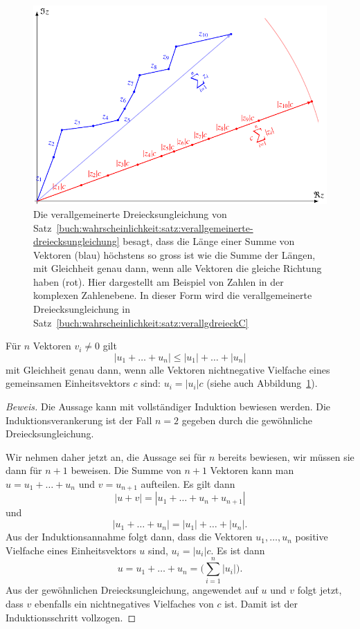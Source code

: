 \begin{figure}
\centering
\includegraphics{chapters/80-wahrscheinlichkeit/images/dreieck.pdf}
\caption{Die verallgemeinerte Dreiecksungleichung von
Satz~\ref{buch:wahrscheinlichkeit:satz:verallgemeinerte-dreiecksungleichung}
besagt, dass
die Länge einer Summe von Vektoren (blau) höchstens so gross ist wie die
Summe der Längen, mit Gleichheit genau dann, wenn alle Vektoren die
gleiche Richtung haben (rot).
Hier dargestellt am Beispiel von Zahlen in der komplexen Zahlenebene.
In dieser Form wird die verallgemeinerte Dreiecksungleichung in
Satz~\ref{buch:wahrscheinlichkeit:satz:verallgdreieckC}
\label{buch:wahrscheinlichkeit:fig:dreieck}}
\end{figure}

\begin{satz}
\label{buch:wahrscheinlichkeit:satz:verallgemeinerte-dreiecksungleichung}
Für $n$ Vektoren $v_i\ne 0$ gilt
\[
|u_1+\dots+u_n| \le |u_1|+\dots+|u_n|
\]
mit Gleichheit genau dann, wenn alle Vektoren nichtnegative Vielfache
eines gemeinsamen Einheitsvektors $c$ sind: $u_i=|u_i|c$
(siehe auch Abbildung~\ref{buch:wahrscheinlichkeit:fig:dreieck}).
\end{satz}

\begin{proof}[Beweis]
Die Aussage kann mit vollständiger Induktion bewiesen werden.
Die Induktionsverankerung ist der Fall $n=2$ gegeben durch die
gewöhnliche Dreiecksungleichung.

Wir nehmen daher jetzt an, die Aussage sei für $n$ bereits bewiesen,
wir müssen sie dann für $n+1$ beweisen.
Die Summe von $n+1$ Vektoren kann man $u=u_1+\dots+u_n$ und $v=u_{n+1}$
aufteilen.
Es gilt dann
\[
|u+v|
=
|u_1+\dots+u_n+u_{n+1}|
\]
und
\[
|u_1+\dots+u_n| = |u_1|+\dots+|u_n|.
\]
Aus der Induktionsannahme folgt dann, dass die Vektoren $u_1,\dots,u_n$
positive Vielfache eines Einheitsvektors $u$ sind, $u_i=|u_i|c$.
Es ist dann
\[
u=u_1+\dots+u_n = \biggl(\sum_{i=1}^n |u_i|\biggr).
\]
Aus der gewöhnlichen Dreiecksungleichung, angewendet auf $u$ und $v$
folgt jetzt, dass $v$ ebenfalls ein nichtnegatives Vielfaches von $c$ ist.
Damit ist der Induktionsschritt vollzogen.
\end{proof}

